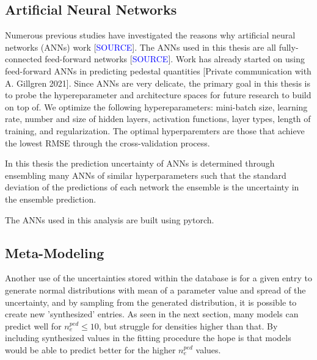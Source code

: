 \documentclass[a4paper, twoside, final, 12pt]{article}
\begin{document}
\subsection{Artificial Neural Networks}

Numerous previous studies have investigated the reasons why artificial neural networks (ANNs) work [\textcolor{blue}{SOURCE}].  The ANNs used in this thesis are all fully-connected feed-forward networks [\textcolor{blue}{SOURCE}]. Work has already started on using feed-forward ANNs in predicting pedestal quantities [Private communication with A. Gillgren 2021]. 
Since ANNs are very delicate, the primary goal in this thesis is to probe the hypereparameter and architecture spaces for future research to build on top of. We optimize the following hypereparameters: mini-batch size, learning rate, number and size of hidden layers, activation functions, layer types, length of training, and regularization. The optimal hyperparemters are those that achieve the lowest RMSE through the cross-validation process.

In this thesis the prediction uncertainty of ANNs is determined through ensembling many ANNs of similar hyperparameters such that the standard deviation of the predictions of each network the ensemble is the uncertainty in the ensemble prediction.

The ANNs used in this analysis are built using pytorch. 

\subsection{Meta-Modeling}
Another use of the uncertainties stored within the database is for a given entry to generate normal distributions with mean of a parameter value and spread of the uncertainty, and by sampling from the generated distribution, it is possible to create new 'synthesized' entries.
As seen in the next section, many models can predict well for $n_e^{ped} \leq 10$, but struggle for densities higher than that.
By including synthesized values in the fitting procedure the hope is that models would be able to predict better for the higher $n_e^{ped}$ values.
\end{document}
